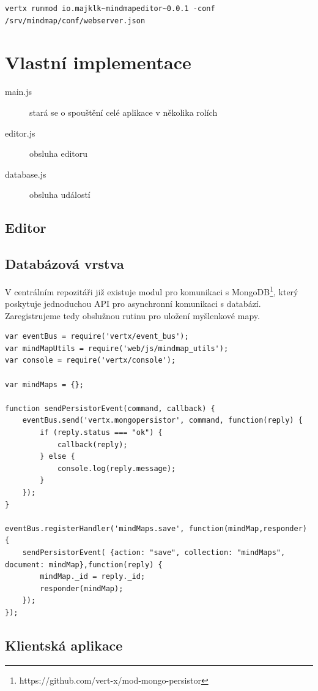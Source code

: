 \begin{lstlisting}
vertx runmod io.majklk~mindmapeditor~0.0.1 -conf /srv/mindmap/conf/webserver.json
\end{lstlisting}

\section{Vlastní implementace}

\begin{description}
\item[main.js] stará se o spouštění celé aplikace v několika rolích
\item[editor.js] obsluha editoru
\item[database.js] obsluha událostí 
\end{description}

\subsection{Editor}

\subsection{Databázová vrstva}

V centrálním repozitáři již existuje modul pro komunikaci s MongoDB\footnote{https://github.com/vert-x/mod-mongo-persistor}, který poskytuje jednoduchou API pro asynchronní komunikaci s databází. Zaregistrujeme tedy obslužnou rutinu pro uložení myšlenkové mapy. 

\begin{lstlisting}
var eventBus = require('vertx/event_bus');
var mindMapUtils = require('web/js/mindmap_utils');
var console = require('vertx/console');

var mindMaps = {};

function sendPersistorEvent(command, callback) {
	eventBus.send('vertx.mongopersistor', command, function(reply) {
		if (reply.status === "ok") {
			callback(reply);
		} else {
			console.log(reply.message);
		}
	});
}

eventBus.registerHandler('mindMaps.save', function(mindMap,responder) {
	sendPersistorEvent(	{action: "save", collection: "mindMaps", document: mindMap},function(reply) {
		mindMap._id = reply._id;
		responder(mindMap);
	});
});

\end{lstlisting}

\subsection{Klientská aplikace}

